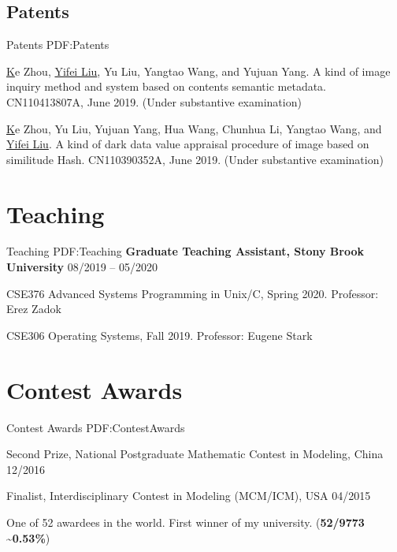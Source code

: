 \documentclass[letterpaper,10pt,oneside]{article}
\begin{document}
\begin{body}
\subsection
{Patents}
{Patents}
{PDF:Patents}
\GapNoBreak

\NumberedItem{[1]}
\href{https://patents.google.com/patent/CN110413807A}
Ke Zhou, \underline{Yifei Liu}, Yu Liu, Yangtao Wang, and Yujuan Yang. A kind of image inquiry method and system based on contents semantic metadata. CN110413807A, June 2019. (Under substantive examination)

\BigGap
\NumberedItem{[2]}
\href{https://patents.google.com/patent/CN110390352A}
Ke Zhou, Yu Liu, Yujuan Yang, Hua Wang, Chunhua Li, Yangtao Wang, and \underline{Yifei Liu}. A kind of dark data value appraisal procedure of image based on similitude Hash. CN110390352A, June 2019. (Under substantive examination)

\section
{Teaching}
{Teaching}
{PDF:Teaching}
\textbf{Graduate Teaching Assistant, Stony Brook University}
\hfill
08/2019 --
05/2020

\GapNoBreak
\BulletItem
CSE376 Advanced Systems Programming in Unix/C, Spring 2020. Professor: Erez Zadok

\GapNoBreak
\BulletItem
CSE306 Operating Systems, Fall 2019. Professor: Eugene Stark


\section
{Contest Awards}
{Contest Awards}
{PDF:ContestAwards}

\BulletItem
Second Prize, National Postgraduate Mathematic Contest in Modeling, China
\hfill
12/2016
\GapNoBreak

\BulletItem
Finalist, Interdisciplinary Contest in Modeling (MCM/ICM), USA
\hfill
04/2015
\begin{detail}
\SubItem
One of 52 awardees in the world. First winner of my university. (\textbf{52/9773 \textasciitilde0.53\%})
\end{detail}


\end{body}
\end{document}
